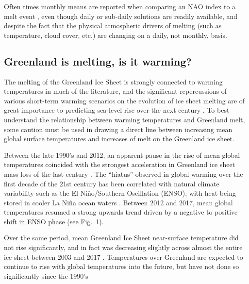 \documentclass[11pt]{report}
\begin{document}
Often times monthly means are reported when comparing an NAO index to a melt event \cite[][]{mattingly2018}, even though daily or sub-daily solutions are readily available, and despite the fact that the physical atmospheric drivers of melting (such as temperature, cloud cover, etc.) are changing on a daily, not monthly, basis.


\subsection{Greenland is melting, is it warming?}
The melting of the Greenland Ice Sheet is strongly connected to warming temperatures in much of the literature, and the significant repercussions of various short-term warming scenarios on the evolution of ice sheet melting are of great importance to predicting sea-level rise over the next century \cite[][]{hahn2018,pattyn2018,ruckamp2018}. To best understand the relationship between warming temperatures and Greenland melt, some caution must be used in drawing a direct line between increasing mean global surface temperatures and increases of melt on the Greenland ice sheet. 

Between the late 1990's and 2012, an apparent pause in the rise of mean global temperatures coincided with the strongest acceleration in Greenland ice sheet mass loss of the last century \cite[][]{kosaka2013,angelen2014,bevis2018}. The ``hiatus'' observed in global warming over the first decade of the 21st century has been correlated with natural climate variability such as the El Ni\~{n}o/Southern Oscillation (ENSO), with heat being stored in cooler La Ni\~{n}a ocean waters \cite[][]{kosaka2013}. Between 2012 and 2017, mean global temperatures resumed a strong upwards trend driven by a negative to positive shift in ENSO phase (see Fig.~\ref{fig:ENSO}).

Over the same period, mean Greenland Ice Sheet near-surface temperature did not rise significantly, and in fact was decreasing slightly across almost the entire ice sheet between 2003 and 2017 \cite[see Figs.~\ref{fig:ENSO}~\&~\ref{fig:Tslope}, and ][]{hearty2018, westergaard2018,reeves2017}. Temperatures over Greenland are expected to continue to rise with global temperatures into the future, but have not done so significantly since the 1990's \cite[][]{reeves2017}


\begin{figure}[h]
\centering
{}
\caption[]{} \label{fig:ENSO}
\end{figure}
\end{document}
